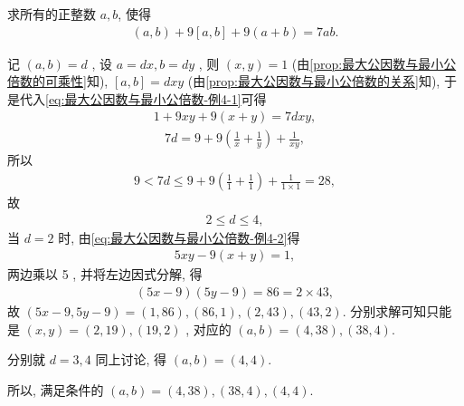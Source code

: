 \begin{example}
	求所有的正整数 $a ,  b$, 使得
\begin{align}\label{eq:最大公因数与最小公倍数-例4-1}
	(a, b)+9[a, b]+9(a+b)=7 a b.
\end{align}
\end{example}
\begin{solution}
	记 $(a, b)=d$ , 设 $a=d x, b=d y$ , 则 $(x, y)=1$ (由\autoref{prop:最大公因数与最小公倍数的可乘性}知),  $[a, b]=d x y$ (由\autoref{prop:最大公因数与最小公倍数的关系}知), 于是代入\autoref{eq:最大公因数与最小公倍数-例4-1}可得
\begin{align}\label{eq:最大公因数与最小公倍数-例4-2}
	1+9 x y+9(x+y)=7 d x y,
\end{align}
\begin{align*}
	7 d=9+9\left(\frac{1}{x}+\frac{1}{y}\right)+\frac{1}{x y},
\end{align*}
所以
\begin{align*}
	9<7 d \leqslant 9+9\left(\frac{1}{1}+\frac{1}{1}\right)+\frac{1}{1 \times 1}=28,
\end{align*}
故
\begin{align*}
	2 \leqslant d \leqslant 4,
\end{align*}
当 $d=2$ 时, 由\autoref{eq:最大公因数与最小公倍数-例4-2}得
\begin{align*}
	5 x y-9(x+y)=1,
\end{align*}
两边乘以 5 , 并将左边因式分解, 得
\begin{align*}
	(5 x-9)(5 y-9)=86=2 \times 43,
\end{align*}
故 $(5 x-9,5 y-9)=(1,86) , (86,1),(2,43) , (43,2)$. 分别求解可知只能是 $(x, y)=(2,19),(19,2)$ , 对应的 $(a, b)=(4,38),(38,4)$.

分别就 $d=3,4$ 同上讨论, 得 $(a, b)=(4,4)$. 

所以, 满足条件的 $(a, b)=(4,38),(38,4),(4,4)$. 
\end{solution}


